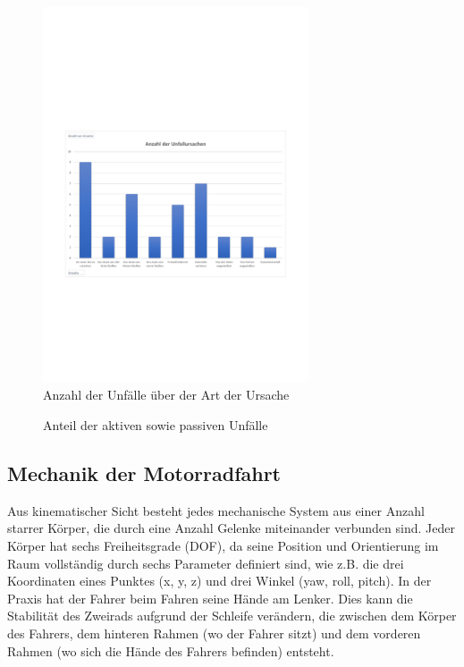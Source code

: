 \begin{figure}[htpb]
	\centering
	\includegraphics[width=0.7\textwidth]{Bilder/youtube_Statistik_AnzahlUnfallUrsachen.pdf}
	\caption{Anzahl der Unfälle über der Art der Ursache}
	\label{fig:youtube_Statistik_AnzahlUnfallUrsachen}
\end{figure}
\begin{figure}[htpb]
	\centering
	\caption{Anteil der aktiven sowie passiven Unfälle}
	\label{fig:youtube_Statistik_AktivPassivUnfall}
\end{figure}





\subsection{Mechanik der Motorradfahrt} %
Aus kinematischer Sicht besteht jedes mechanische System aus einer Anzahl starrer Körper, die durch eine Anzahl Gelenke miteinander verbunden sind. Jeder Körper hat sechs Freiheitsgrade (DOF), da seine Position und Orientierung im Raum vollständig durch sechs Parameter definiert sind, wie z.B. die drei Koordinaten eines Punktes (x, y, z) und drei Winkel (yaw, roll, pitch).
In der Praxis hat der Fahrer beim Fahren seine Hände am Lenker. Dies kann die Stabilität des Zweirads aufgrund der Schleife verändern, die zwischen dem Körper des Fahrers, dem hinteren Rahmen (wo der Fahrer sitzt) und dem vorderen Rahmen (wo sich die Hände des Fahrers befinden) entsteht.\citep{Cossalter2014}


